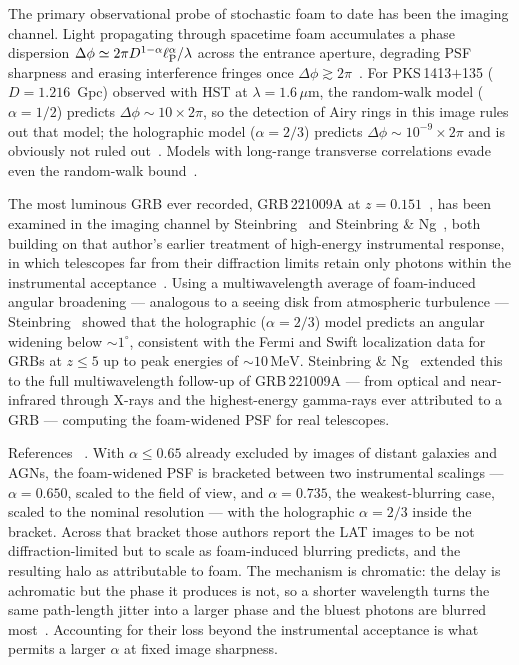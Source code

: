 \documentclass[aps,prd,onecolumn,amsmath,amssymb]{revtex4-2}
\begin{document}
The primary observational probe of stochastic foam to date has been the imaging
channel. Light propagating through spacetime foam accumulates a phase dispersion
$\Delta\phi \simeq 2\pi D^{1-\alpha}\ell_{\rm P}^{\alpha}/\lambda$ across the
entrance aperture, degrading PSF sharpness and erasing interference fringes once
$\Delta\phi \gtrsim 2\pi$~\cite{LieuHillman2003}.
For PKS\,1413$+$135 ($D = 1.216$~Gpc) observed with HST at $\lambda=1.6\,\mu$m,
the random-walk model ($\alpha=1/2$) predicts $\Delta\phi \sim 10\times 2\pi$,
so the detection of Airy rings in this image rules out that model;
the holographic model ($\alpha=2/3$) predicts $\Delta\phi \sim 10^{-9}\times 2\pi$
and is obviously not ruled out~\cite{NgPerlman2022,Christiansen2011,Perlman2015}.
Models with long-range transverse correlations evade even the random-walk
bound~\cite{LeeZurekChen2024}.

The most luminous GRB ever recorded, GRB\,221009A at $z=0.151$~\cite{Ravasio2024}, has been
examined in the imaging channel by Steinbring~\cite{Steinbring2023} and
Steinbring \& Ng~\cite{SteinbringNg2026}, both building on that
author's earlier treatment of high-energy instrumental response, in which
telescopes far from their diffraction limits retain only photons within the
instrumental acceptance~\cite{Steinbring2007,Steinbring2015}.
Using a multiwavelength average of foam-induced angular broadening ---
analogous to a seeing disk from atmospheric turbulence ---
Steinbring~\cite{Steinbring2023} showed that the holographic ($\alpha=2/3$)
model predicts an angular widening below $\sim\!1^{\circ}$, consistent
with the Fermi and Swift localization data for GRBs at $z\leq 5$ up to
peak energies of $\sim\!10\,\mathrm{MeV}$.
Steinbring \& Ng~\cite{SteinbringNg2026} extended this to the full
multiwavelength follow-up of GRB\,221009A --- from optical and near-infrared
through X-rays and the highest-energy gamma-rays ever attributed to a GRB ---
computing the foam-widened PSF for real
telescopes.

References~\cite{Steinbring2023,SteinbringNg2026} .
With $\alpha\leq0.65$ already excluded by images of distant galaxies and
AGNs, the foam-widened PSF is bracketed between two instrumental scalings ---
$\alpha=0.650$, scaled to the field of view, and $\alpha=0.735$, the
weakest-blurring case, scaled to the nominal resolution --- with the
holographic $\alpha=2/3$ inside the bracket.  Across that bracket those authors
report the LAT images to be not diffraction-limited but to scale as
foam-induced blurring predicts, and  the resulting
halo as attributable to foam.  The mechanism is chromatic: the delay is achromatic but the phase
it produces is not, so a shorter wavelength turns the same path-length jitter
into a larger phase and the bluest photons are blurred
most~\cite{Steinbring2007}.  Accounting for their loss beyond the
instrumental acceptance is what permits a larger $\alpha$ at fixed image
sharpness.
\end{document}
